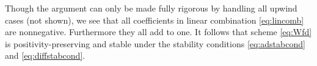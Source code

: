 \documentclass[12pt,final]{amsart}%
\begin{document}
Though the argument can only be made fully rigorous by handling all upwind cases (not shown), we see that all coefficients in linear combination \eqref{eq:lincomb} are nonnegative.  Furthermore they all add to one.  It follows \citep{MortonMayers} that scheme \eqref{eq:Wfd} is positivity-preserving and stable under the stability conditions \eqref{eq:adstabcond} and \eqref{eq:diffstabcond}.
\end{document}
